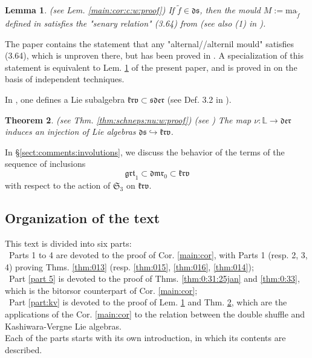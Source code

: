 \documentclass[10pt]{amsart}
\newtheorem{thm}{Theorem}[section]
\newtheorem{lem}[thm]{Lemma}
\numberwithin{equation}{subsection}
\begin{document}
\begin{lem}\label{main:cor:c} (see Lem. \ref{main:cor:c:w:proof})
If $\tilde f \in\mathfrak{ds}$, then the mould $M:=\mathrm{ma}_{\tilde f}$ 
defined in \cite{FK} satisfies the "senary relation" (3.64) from \cite{Ec2}
(see also (1) in \cite{FK}). 
\end{lem}

The paper \cite{Ec2} contains the statement that any "alternal//alternil mould" satisfies (3.64), 
which is unproven there, but has been proved in \cite{Kaw}. 
A specialization of this statement is equivalent to Lem. \ref{main:cor:c} of the present paper, and is proved
in \cite{Sch2} on the basis of independent techniques. 


In \cite{AT}, one defines a Lie subalgebra $\mathfrak{krv}\subset\mathfrak{sder}$ (see Def. 3.2 in \cite{FK}). 

\begin{thm} \label{thm:schneps:nu} (see Thm. \ref{thm:schneps:nu:w:proof})
(see \cite{Sch1,Sch2}) The map $\nu : \mathbb L\to\mathfrak{der}$ induces an injection of Lie algebras $\mathfrak{ds}\hookrightarrow\mathfrak{krv}$. 
\end{thm}

In \S\ref{sect:comments:involutions}, we discuss the behavior of the terms of the sequence of inclusions 
$$
\mathfrak{grt}_1\subset \mathfrak{dmr}_0\subset \mathfrak{krv}
$$
with respect to the action of 
$\mathfrak S_3$ on $\mathfrak{krv}$.

\subsection{Organization of the text} 

This text is divided into six parts: \\
\textbullet\ Parts 1 to 4 are devoted to the proof of Cor. \ref{main:cor}, with Parts 1 (resp. 2, 3, 4) 
proving Thms. \ref{thm:013} (resp. \ref{thm:015}, \ref{thm:016}, \ref{thm:014});  \\
\textbullet\ Part \ref{part 5} is devoted to the proof of Thms. \ref{thm:0:31:25jan} and \ref{thm:0:33}, 
which is the bitorsor counterpart of Cor. \ref{main:cor}; \\
\textbullet\ Part \ref{part:kv} is devoted to the proof of Lem. \ref{main:cor:c} and Thm. \ref{thm:schneps:nu}, 
which are the applications of the Cor. \ref{main:cor} to the relation between the double shuffle and 
Kashiwara-Vergne Lie algebras. \\
Each of the parts starts with its own introduction, in which its contents are described.  
\end{document}
